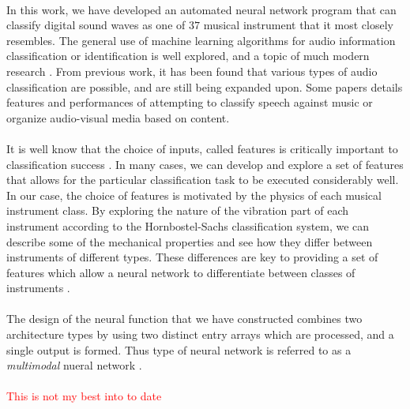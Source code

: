 \documentclass[12pt,letterpaper]{article}
\begin{document}
\paragraph*{}In this work, we have developed an automated neural network program that can classify digital sound waves as one of $37$ musical instrument that it most closely resembles. The general use of machine learning algorithms for audio information classification or identification is well explored, and a topic of much modern research \cite{Khan,Liu,Mierswa,Serizel,Zhang}. From previous work, it has been found that various types of audio classification are possible, and are still being expanded upon. Some papers details features and performances of attempting to classify speech against music or organize audio-visual media based on content.

\paragraph*{}It is well know that the choice of inputs, called features is critically important to classification success \cite{Khan,Serizel}. In many cases, we can develop and explore a set of features that allows for the particular classification task to be executed considerably well. In our case, the choice of features is motivated by the physics of each musical instrument class. By exploring the nature of the vibration part of each instrument according to the Hornbostel-Sachs classification system, we can describe some of the mechanical properties and see how they differ between instruments of different types. These differences are key to providing a set of features which allow a neural network to differentiate between classes of instruments \cite{Liu,Zhang}. 

\paragraph*{}The design of the neural function that we have constructed combines two architecture types by using two distinct entry arrays which are processed, and a single output is formed. Thus type of neural network is referred to as a \textit{multimodal} nueral network \cite{Li,Ngiam}.

\paragraph*{}\textcolor{red}{This is not my best into to date}
\end{document}
